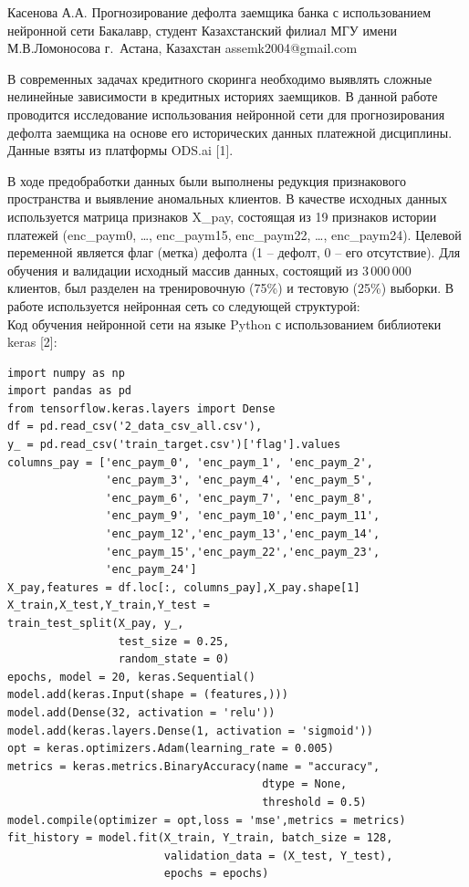 \documentclass{msukz}	%
\begin{document}
\info %
{Касенова А.А.}										%
{Прогнозирование дефолта заемщика банка с использованием нейронной сети}	%
{Бакалавр, студент}											%
{Казахстанский филиал МГУ имени М.В.Ломоносова}					%
{г.~Астана, Казахстан}											%
{assemk2004@gmail.com}									%

В современных задачах кредитного скоринга необходимо выявлять сложные нелинейные зависимости в кредитных историях заемщиков. В данной работе проводится исследование использования нейронной сети для прогнозирования дефолта заемщика на основе его исторических данных платежной дисциплины. Данные взяты из платформы ODS.ai [1].
  
В ходе предобработки данных были выполнены редукция признакового пространства и выявление аномальных клиентов. В качестве исходных данных используется матрица признаков X\_pay, состоящая из 19 признаков истории платежей (enc\_paym0, \dots, enc\_paym15, enc\_paym22, \dots, enc\_paym24). Целевой переменной является флаг (метка) дефолта (1 -- дефолт, 0 -- его отсутствие). Для обучения и валидации исходный массив данных, состоящий из 3\,000\,000 клиентов, был разделен на тренировочную (75\%) и тестовую (25\%) выборки. В работе используется нейронная сеть со следующей структурой:
 \\

Код обучения нейронной сети на языке Python с использованием библиотеки keras [2]:
\begin{lstlisting}
import numpy as np
import pandas as pd
from tensorflow.keras.layers import Dense
df = pd.read_csv('2_data_csv_all.csv'),
y_ = pd.read_csv('train_target.csv')['flag'].values 
columns_pay = ['enc_paym_0', 'enc_paym_1', 'enc_paym_2',
               'enc_paym_3', 'enc_paym_4', 'enc_paym_5', 
               'enc_paym_6', 'enc_paym_7', 'enc_paym_8', 
               'enc_paym_9', 'enc_paym_10','enc_paym_11', 
               'enc_paym_12','enc_paym_13','enc_paym_14', 
               'enc_paym_15','enc_paym_22','enc_paym_23', 
               'enc_paym_24']
X_pay,features = df.loc[:, columns_pay],X_pay.shape[1] 
X_train,X_test,Y_train,Y_test =
train_test_split(X_pay, y_, 
                 test_size = 0.25, 
                 random_state = 0)
epochs, model = 20, keras.Sequential()
model.add(keras.Input(shape = (features,)))  
model.add(Dense(32, activation = 'relu'))   
model.add(keras.layers.Dense(1, activation = 'sigmoid'))
opt = keras.optimizers.Adam(learning_rate = 0.005)
metrics = keras.metrics.BinaryAccuracy(name = "accuracy", 
                                       dtype = None, 
                                       threshold = 0.5)
model.compile(optimizer = opt,loss = 'mse',metrics = metrics)
fit_history = model.fit(X_train, Y_train, batch_size = 128,
                        validation_data = (X_test, Y_test), 
                        epochs = epochs)
\end{lstlisting}
\end{document}
